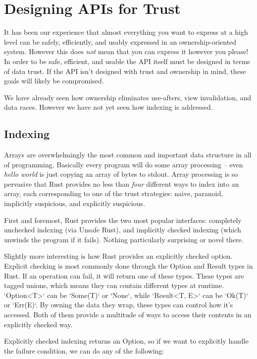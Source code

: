 \chapter{Designing APIs for Trust}
\label{ch:design}

It has been our experience that almost everything you want to express at a high level
can be safely, efficiently, and usably expressed in an ownership-oriented system.
However this does \emph{not} mean that you can express it however you please!
In order to be safe, efficient, and usable the API itself must be designed in
terms of data trust. If the API isn't designed with trust and ownership in mind,
these goals will likely be compromised.

We have already seen how ownership eliminates use-afters, view invalidation,
and data races. However we have not yet seen how indexing is addressed.




\section{Indexing}

Arrays are overwhelmingly
the most common and important data structure in all of programming. Basically every
program will do some array processing -- even \emph{hello world} is just copying an
array of bytes to stdout. Array processing is so pervasive that Rust provides no
less than \emph{four} different ways to index into an array, each corresponding to
one of the trust strategies: naive, paranoid, implicitly suspicious, and
explicitly suspicious.

First and foremost, Rust provides the two most popular interfaces: completely
unchecked indexing (via Unsafe Rust), and implicitly checked indexing (which
unwinds the program if it fails). Nothing particularly surprising or
novel there.

Slightly more interesting is how Rust provides an explicitly checked option.
Explicit checking is most commonly done through the Option and Result types
in Rust. If an operation can fail, it will return one of these types.
These types are tagged unions, which means they can contain different
types at runtime. `Option<T>` can be `Some(T)` or `None`, while `Result<T, E>`
can be `Ok(T)` or `Err(E)`. By owning the data they wrap, these types can control
how it's accessed. Both of them provide a multitude of ways to access their
contents in an explicitly checked way.

Explicitly checked indexing returns an Option, so if we want to explicitly
handle the failure condition, we can do any of the following:

